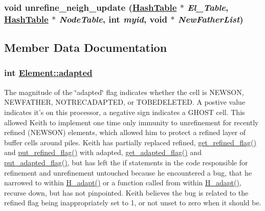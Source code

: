 \hypertarget{classElement_n7}{
\subsubsection[unrefine\_\-neigh\_\-update]{\setlength{\rightskip}{0pt plus 5cm}void unrefine\_\-neigh\_\-update (\hyperlink{classHashTable}{Hash\-Table} $\ast$ {\em El\_\-Table}, \hyperlink{classHashTable}{Hash\-Table} $\ast$ {\em Node\-Table}, int {\em myid}, void $\ast$ {\em New\-Father\-List})}}
\label{classElement_n7}




\subsection{Member Data Documentation}
\hypertarget{classElement_r20}{
\subsubsection[adapted]{\setlength{\rightskip}{0pt plus 5cm}int \hyperlink{classElement_r20}{Element::adapted}}}
\label{classElement_r20}


The magnitude of the \char`\"{}adapted\char`\"{} flag indicates whether the cell is NEWSON, NEWFATHER, NOTRECADAPTED, or TOBEDELETED. A postive value indicates it's on this processor, a negative sign indicates a GHOST cell. This allowed Keith to implement one time only immunity to unrefinement for recently refined (NEWSON) elements, which allowed him to protect a refined layer of buffer cells around piles. Keith has partially replaced refined, \hyperlink{classElement_a33}{get\_\-refined\_\-flag()} and \hyperlink{classElement_a36}{put\_\-refined\_\-flag()} with adapted, \hyperlink{classElement_a34}{get\_\-adapted\_\-flag()} and \hyperlink{classElement_a37}{put\_\-adapted\_\-flag()}, but has left the if statements in the code responsible for refinement and unrefinement untouched because he encountered a bug, that he narrowed to within \hyperlink{hadpt_8C_a12}{H\_\-adapt()} or a function called from within \hyperlink{hadpt_8C_a12}{H\_\-adapt()}, recurse down, but has not pinpointed. Keith believes the bug is related to the refined flag being inappropriately set to 1, or not unset to zero when it should be. 

